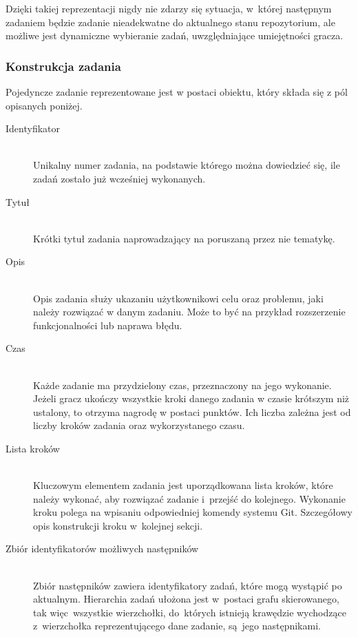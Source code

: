 \documentclass[12pt,a4paper,polish,thesis]{dcsbook}
\begin{document}
{	Dzięki takiej reprezentacji nigdy nie zdarzy się sytuacja, w~której następnym zadaniem będzie zadanie nieadekwatne do aktualnego stanu repozytorium, ale możliwe jest dynamiczne wybieranie zadań, uwzględniające umiejętności gracza.

	\subsubsection{Konstrukcja zadania}
	Pojedyncze zadanie reprezentowane jest w postaci obiektu, który składa się z pól opisanych poniżej.
	\begin{description}
	\item[Identyfikator] \hfill \\
		Unikalny numer zadania, na podstawie którego można dowiedzieć się, ile zadań zostało już wcześniej wykonanych.
		
	\item[Tytuł] \hfill \\
		Krótki tytuł zadania naprowadzający na poruszaną przez nie tematykę.
	
	\item[Opis] \hfill \\
		Opis zadania służy ukazaniu użytkownikowi celu oraz problemu, jaki należy rozwiązać w danym zadaniu. Może to być na przykład rozszerzenie funkcjonalności lub naprawa błędu.
		
	\item[Czas] \hfill \\
		Każde zadanie ma przydzielony czas, przeznaczony na jego wykonanie. Jeżeli gracz ukończy wszystkie kroki danego zadania w czasie krótszym niż ustalony, to otrzyma nagrodę w postaci punktów. Ich liczba zależna jest od liczby kroków zadania oraz wykorzystanego czasu.	
	
	\item[Lista kroków] \hfill \\
		Kluczowym elementem zadania jest uporządkowana lista kroków, które należy wykonać, aby rozwiązać zadanie i~przejść do kolejnego. Wykonanie kroku polega na wpisaniu odpowiedniej komendy systemu Git. Szczegółowy opis konstrukcji kroku w~kolejnej sekcji.
		
	\item[Zbiór identyfikatorów możliwych następników] \hfill \\
		Zbiór następników zawiera identyfikatory zadań, które mogą wystąpić po aktualnym. Hierarchia zadań ułożona jest w~postaci grafu skierowanego, tak więc~wszystkie wierzchołki, do~których istnieją krawędzie wychodzące z~wierzchołka reprezentującego dane zadanie, są~jego następnikami.	
	\end{description}

}
\end{document}
